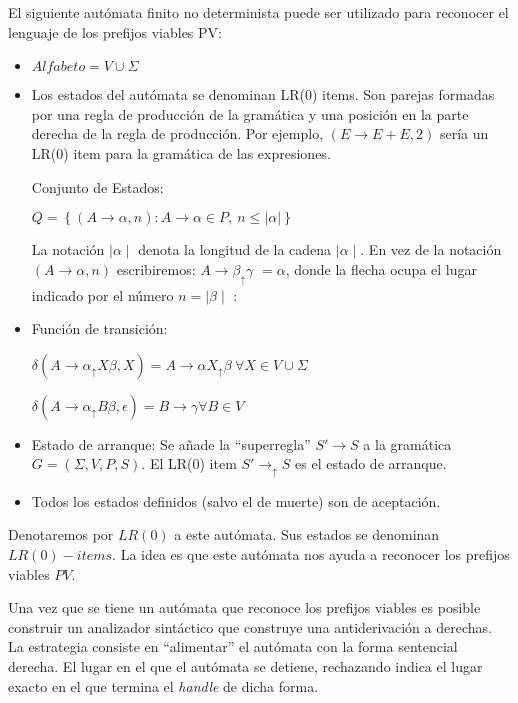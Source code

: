 \begin{definition}
\label{definition:slrautomata}
El siguiente autómata finito no determinista puede ser utilizado para
reconocer el lenguaje de los prefijos viables PV:
\begin{itemize}
\item
$Alfabeto = V \cup \Sigma$
\item
Los estados del autómata se denominan LR(0) items. Son parejas formadas
por una regla de producción de la gramática y una posición en la parte derecha 
de la regla de producción. Por ejemplo, $(E \rightarrow E + E, 2)$ sería un
LR(0) item para la gramática de las expresiones.

Conjunto de Estados:

$Q =  \left \{ (A \rightarrow \alpha, n) :  A \rightarrow \alpha \in P,\ n \le |\alpha| \right \}$

 La notación $\mid \alpha \mid$ denota la longitud de la cadena $\mid \alpha \mid$.
 En vez de la notación $(A \rightarrow \alpha, n)$ escribiremos: 
 $A \rightarrow \beta _\uparrow \gamma$ $ = \alpha$, 
 donde la flecha ocupa el lugar indicado por el número $n = \mid \beta \mid$ :
\item
Función de transición:

$\delta(A \rightarrow \alpha _\uparrow X \beta, X) = A \rightarrow \alpha X _\uparrow \beta\ \forall X \in  V \cup \Sigma$ 

$\delta(A \rightarrow \alpha _\uparrow B \beta, \epsilon) = B \rightarrow \gamma  \forall B \in  V$ 
\item
Estado de arranque: Se añade la ``superregla'' $S' \rightarrow S$ a la gramática $G = (\Sigma,V,P,S)$. El LR(0) item 
$S' \rightarrow _\uparrow S$ es el estado de arranque.
\item
Todos los estados definidos (salvo el de muerte) son de aceptación.
\end{itemize}
\end{definition}

Denotaremos por $LR(0)$ a este autómata. Sus estados se denominan $LR(0)-items$. La idea es que este
autómata nos ayuda a reconocer los prefijos viables $PV$.

Una vez que se tiene un autómata que reconoce los prefijos viables es posible construir un analizador sintáctico que construye una antiderivación a derechas. La estrategia consiste en ``alimentar'' el autómata con la forma sentencial derecha. El lugar en el que el autómata se detiene, rechazando indica el lugar exacto en el que termina el \emph{handle} de dicha forma.


